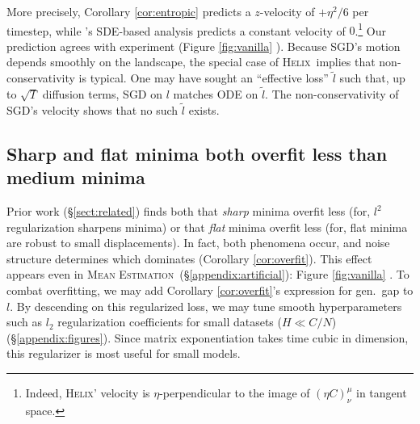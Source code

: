 \documentclass[final,12pt]{colt2021} %
\newcommand{\ofsix}[1]{
    {\tiny \raisebox{0.04cm}{$\substack{
        \ifthenelse{\equal{#1}{0}}{{\color{moor}\blacksquare}}{\square}
        \ifthenelse{\equal{#1}{2}}{{\color{moor}\blacksquare}}{\square}    
        \ifthenelse{\equal{#1}{4}}{{\color{moor}\blacksquare}}{\square} \\
        \ifthenelse{\equal{#1}{1}}{{\color{moor}\blacksquare}}{\square}    
        \ifthenelse{\equal{#1}{3}}{{\color{moor}\blacksquare}}{\square}
        \ifthenelse{\equal{#1}{5}}{{\color{moor}\blacksquare}}{\square}
    }$}}%
}
\newcommand{\Helix}{\textsc{Helix}}
\newcommand{\MeanEstimation}{\textsc{Mean Estimation}}
\begin{document}
            More precisely, Corollary \ref{cor:entropic} predicts 
            a $z$-velocity of $+\eta^2/6$ per timestep, while \cite{ch18}'s
            SDE-based analysis predicts a constant velocity of $0$.\footnote{
                Indeed, \Helix' velocity is $\eta$-perpendicular to the image
                of $(\eta C)^\mu_\nu$ in tangent space.
            }
            Our prediction agrees with experiment (Figure
            \ref{fig:vanilla}\ofsix{4}).
            Because SGD's motion depends smoothly on the landscape, the special
            case of \Helix\ implies that non-conservativity is typical.
            One may have sought an ``effective loss'' $\tilde{l}$ such that, up
            to $\sqrt{T}$ diffusion terms, SGD on $l$ matches ODE on
            $\tilde{l}$.  The non-conservativity of SGD's velocity shows that
            no such $\tilde{l}$ exists.
    
    
        \subsection{Sharp and flat minima both overfit less than medium minima} \label{subsect:overfit}
    
            Prior work (\S\ref{sect:related}) finds both that \emph{sharp} minima
            overfit less (for, $l^2$ regularization sharpens minima) or that
            \emph{flat} minima overfit less (for, flat minima are robust to small
            displacements).  In fact, both phenomena occur, and noise structure
            determines which dominates (Corollary \ref{cor:overfit}).  This effect
            appears even in \MeanEstimation\, (\S\ref{appendix:artificial}): Figure
            \ref{fig:vanilla}\ofsix{5}.
            To combat overfitting, we may add Corollary \ref{cor:overfit}'s
            expression for gen.\ gap to $l$.  By descending on this regularized
            loss, we may tune smooth hyperparameters such as $l_2$ regularization
            coefficients for small datasets ($H \ll C/N$)
            (\S\ref{appendix:figures}).  Since matrix exponentiation takes time
            cubic in dimension, this regularizer is most useful for small models.
\end{document}
